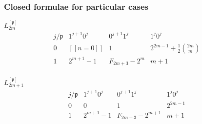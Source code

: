 \documentclass{beamer}
\begin{document}
\begin{frame}\frametitle{Closed formulae for particular cases}
\begin{block}{$L_{2m}^{[\mathfrak{p}]}$}
\begin{displaymath}
\begin{array}{c|ccc}
j/\mathfrak{p} & {1^{j+1}0^{j}} & {0^{j+1}1^{j}} & {1^{j}0^{j}} \\
\hline
0 &  [\![n = 0]\!] &  1 & 2^{2m-1} + \frac{1}{2}{ {2m}\choose{m} } \\
1 &  2^{m+1} -1 &  F_{2m+3}-2^{m} & m+1 \\
\end{array}{}
\end{displaymath}
\end{block}

\begin{block}{$L_{2m+1}^{[\mathfrak{p}]}$}
\begin{displaymath}
\begin{array}{c|ccc}
j/\mathfrak{p} & {1^{j+1}0^{j}} & {0^{j+1}1^{j}} & {1^{j}0^{j}} \\
\hline
0 &  0 &  1 & 2^{2m-1} \\
1 &  2^{m+1} -1 & F_{2m+3}-2^{m+1} & m+1 \\
\end{array}{}
\end{displaymath}
\end{block}
\end{frame}
\end{document}
